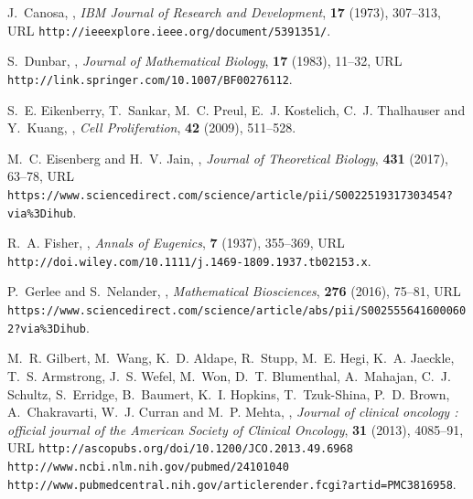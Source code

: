\documentclass{aims}
\numberwithin{equation}{section}
\begin{document}
\providecommand{\href}[2]{#2}
\providecommand{\arxiv}[1]{\href{http://arxiv.org/abs/#1}{arXiv:#1}}
\providecommand{\url}[1]{\texttt{#1}}
\providecommand{\urlprefix}{URL }
\begin{thebibliography}{10}

\newblock J.~Canosa,
,
\newblock \emph{IBM Journal of Research and Development}, \textbf{17} (1973),
  307--313,
\newblock \urlprefix\url{http://ieeexplore.ieee.org/document/5391351/}.

\newblock S.~Dunbar,
,
\newblock \emph{Journal of Mathematical Biology}, \textbf{17} (1983), 11--32,
\newblock \urlprefix\url{http://link.springer.com/10.1007/BF00276112}.

\newblock S.~E. Eikenberry, T.~Sankar, M.~C. Preul, E.~J. Kostelich, C.~J.
  Thalhauser and Y.~Kuang,
,
\newblock \emph{Cell Proliferation}, \textbf{42} (2009), 511--528.

\newblock M.~C. Eisenberg and H.~V. Jain,
,
\newblock \emph{Journal of Theoretical Biology}, \textbf{431} (2017), 63--78,
\newblock
  \urlprefix\url{https://www.sciencedirect.com/science/article/pii/S0022519317303454?via{\%}3Dihub}.

\newblock R.~A. Fisher,
,
\newblock \emph{Annals of Eugenics}, \textbf{7} (1937), 355--369,
\newblock
  \urlprefix\url{http://doi.wiley.com/10.1111/j.1469-1809.1937.tb02153.x}.

\newblock P.~Gerlee and S.~Nelander,
,
\newblock \emph{Mathematical Biosciences}, \textbf{276} (2016), 75--81,
\newblock
  \urlprefix\url{https://www.sciencedirect.com/science/article/abs/pii/S0025556416000602?via{\%}3Dihub}.

\newblock M.~R. Gilbert, M.~Wang, K.~D. Aldape, R.~Stupp, M.~E. Hegi, K.~A.
  Jaeckle, T.~S. Armstrong, J.~S. Wefel, M.~Won, D.~T. Blumenthal, A.~Mahajan,
  C.~J. Schultz, S.~Erridge, B.~Baumert, K.~I. Hopkins, T.~Tzuk-Shina, P.~D.
  Brown, A.~Chakravarti, W.~J. Curran and M.~P. Mehta,
,
\newblock \emph{Journal of clinical oncology : official journal of the American
  Society of Clinical Oncology}, \textbf{31} (2013), 4085--91,
\newblock \urlprefix\url{http://ascopubs.org/doi/10.1200/JCO.2013.49.6968
  http://www.ncbi.nlm.nih.gov/pubmed/24101040
  http://www.pubmedcentral.nih.gov/articlerender.fcgi?artid=PMC3816958}.


\end{thebibliography}
\end{document}
